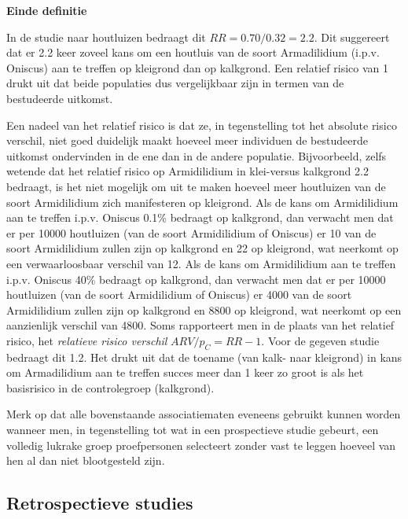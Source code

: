 \documentclass[
  12pt,dutch,coursenotes]{book}
\theoremstyle{definition}
\theoremstyle{definition}
\theoremstyle{definition}
\theoremstyle{remark}
\begin{document}
\textbf{Einde definitie}

In de studie naar houtluizen bedraagt dit \(RR=0.70/0.32=2.2\). Dit
suggereert dat er 2.2 keer zoveel kans om een houtluis van de soort Armadilidium (i.p.v. Oniscus) aan te treffen op kleigrond dan op kalkgrond. Een
relatief risico van 1 drukt uit dat beide populaties dus vergelijkbaar zijn in termen van de bestudeerde uitkomst.

Een nadeel van het relatief risico is dat ze, in tegenstelling tot het absolute risico verschil, niet goed duidelijk maakt hoeveel meer individuen de bestudeerde uitkomst ondervinden in de ene dan in de andere populatie. Bijvoorbeeld, zelfs wetende dat het relatief risico op Armidilidium in klei-versus kalkgrond 2.2 bedraagt, is het niet mogelijk om uit te maken hoeveel meer houtluizen van de soort Armidilidium zich manifesteren op kleigrond. Als de kans om Armidilidium aan te treffen i.p.v. Oniscus 0.1\% bedraagt op kalkgrond, dan verwacht men dat er per 10000 houtluizen (van de soort Armidilidium of Oniscus) er 10 van de soort Armidilidium zullen zijn op kalkgrond en 22 op kleigrond, wat neerkomt op een verwaarloosbaar verschil van 12. Als de kans om Armidilidium aan te treffen i.p.v. Oniscus 40\% bedraagt op kalkgrond, dan verwacht men dat er per 10000 houtluizen (van de soort Armidilidium of Oniscus) er 4000 van de soort Armidilidium zullen zijn op kalkgrond en 8800 op kleigrond, wat neerkomt op een aanzienlijk verschil van 4800. Soms rapporteert men in de plaats van het relatief risico, het
\emph{relatieve risico verschil} \(ARV/p_C=RR-1\). Voor de gegeven studie
bedraagt dit 1.2. Het drukt uit dat de toename (van kalk- naar kleigrond) in kans om Armadilidium aan te treffen succes meer dan 1 keer zo groot is als het basisrisico in de controlegroep (kalkgrond).

Merk op dat alle bovenstaande associatiematen eveneens gebruikt kunnen
worden wanneer men, in tegenstelling tot wat in een prospectieve studie
gebeurt, een volledig lukrake groep proefpersonen selecteert zonder vast te
leggen hoeveel van hen al dan niet blootgesteld zijn.

\hypertarget{subsec:retrospect}{%
\subsection{Retrospectieve studies}\label{subsec:retrospect}}
\end{document}
